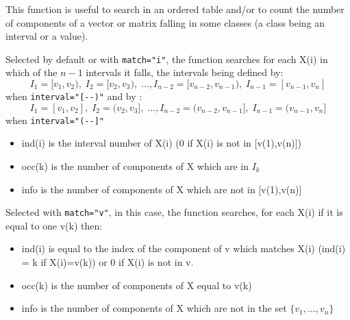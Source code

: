 \begin{mandescription}
This function is useful to search in an ordered table and/or to count the number of components
of a vector or matrix falling in some classes (a class being an interval or a value).

Selected by default or with  \verb+match="i"+, the function searches for each
X(i) in which of the $n-1$ intervals it falls, the intervals being defined by:
$$
   I_1 = [v_1, v_2), \;I_2 = [v_2, v_3),\;...,I_{n-2} = [v_{n-2},
   v_{n-1}),\; I_{n-1} = [v_{n-1}, v_n] 
$$
when \verb+interval="[--)"+ and by :
$$
   I_1 = [v_1, v_2], \;I_2 = (v_2, v_3],\;...,I_{n-2} = (v_{n-2},
   v_{n-1}],\; I_{n-1} = (v_{n-1}, v_n] 
$$
when \verb+interval="(--]"+
\begin{itemize}
   \item ind(i) is the interval number of X(i) (0 if X(i) is not in [v(1),v(n)])
   \item occ(k)  is the number of components of X which are in $I_k$
   \item info is the number of components of X which are not in [v(1),v(n)] 
\end{itemize}

Selected with  \verb+match="v"+, in this case, the function searches,
for each X(i) if it is equal to one v(k) then:
\begin{itemize}
   \item ind(i) is equal to the index of the component of v which matches X(i) 
                   (ind(i) = k if X(i)=v(k)) or 0 if X(i) is not in v.
   \item occ(k) is the number of components of X equal to v(k)
   \item info is the number of components of X which are not in the set $\{v_1,...,v_n\}$ 
\end{itemize}

\end{mandescription}

